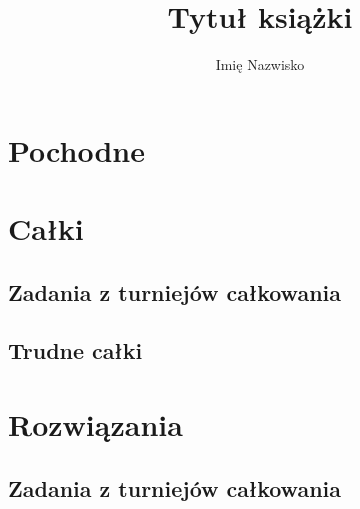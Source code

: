 \documentclass[9pt, twoside, a5paper]{extbook}
\author{Imię Nazwisko}
\title{Tytuł książki}
\theoremstyle{remark}
\begin{document}






\chapter{Pochodne}


\chapter{Całki}





	

\section{Zadania z turniejów całkowania}
	



\section{Trudne całki}
	
	
	

\chapter{Rozwiązania}
% 
% 
% 
% 
% 


\section{Zadania z turniejów całkowania}
	
\end{document}
